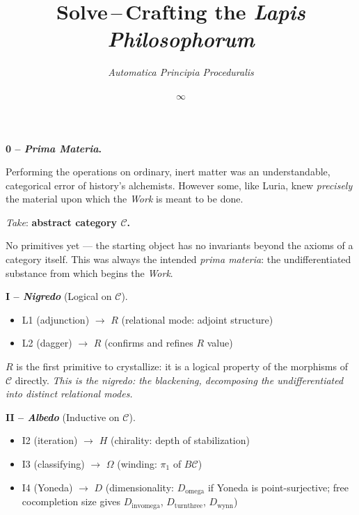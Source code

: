 \documentclass[twocolumn]{article}
\title{\Huge \textbf{Solve}\,--\,\huge Crafting the \emph{Lapis Philosophorum}}
\author{\normalsize \emph{Automatica Principia Proceduralis}}
\date{$\infty$}
\begin{document}

\bigskip
\noindent\textbf{\large 0 -- \emph{Prima Materia}.}

{\normalsize Performing the operations on ordinary, inert matter was an understandable, categorical error of history's alchemists. However some, like Luria, knew \emph{precisely} the material upon which the \emph{Work} is meant to be done.}

\emph{Take}: \textbf{abstract category $\mathcal{C}$.}

No primitives yet --- the starting object has no invariants beyond the axioms of a category itself. This was always the intended \emph{prima materia}: the undifferentiated substance from which begins the \emph{Work}.

\bigskip
\noindent\textbf{\large I -- \emph{Nigredo}} (Logical on $\mathcal{C}$).
\begin{itemize}[nosep,leftmargin=1.5em]
  \item L1 (adjunction) $\to$ $R$ (relational mode: adjoint structure)
  \item L2 (dagger) $\to$ $R$ (confirms and refines $R$ value)
\end{itemize}

$R$ is the first primitive to crystallize: it is a logical property of the morphisms of $\mathcal{C}$ directly.\newline
\textit{This is the \emph{nigredo}: the blackening, decomposing the undifferentiated into distinct relational modes.}

\bigskip
\noindent\textbf{\large II -- \emph{Albedo}} (Inductive on $\mathcal{C}$).
\begin{itemize}[nosep,leftmargin=1.5em]
  \item I2 (iteration) $\to$ $H$ (chirality: depth of stabilization)
  \item I3 (classifying) $\to$ $\Omega$ (winding: $\pi_1$ of $B\mathcal{C}$)
  \item I4 (Yoneda) $\to$ $D$ (dimensionality: $D_{\text{omega}}$ if Yoneda is point-surjective; free cocompletion size gives $D_{\text{invomega}}$, $D_{\text{turnthree}}$, $D_{\text{wynn}}$)
\end{itemize}
\end{document}
